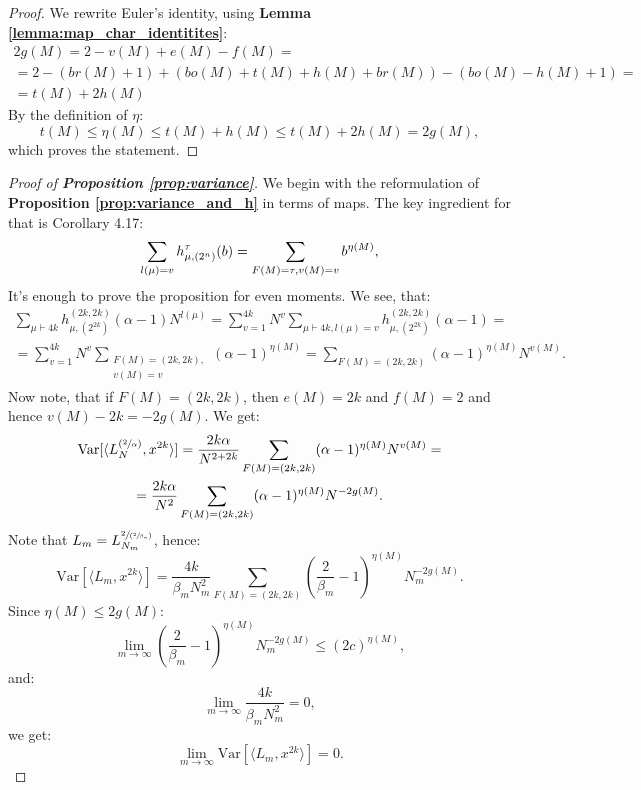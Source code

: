 \documentclass{article}
\newcommand{\Var}{\mathrm{Var}}
\begin{document}
\begin{proof}
    We rewrite Euler's identity, using \textbf{Lemma \ref{lemma:map_char_identitites}}:
    \begin{multline*}
        2g(M) = 2 - v(M) + e(M) - f(M) = \\ = 2 - (br(M) + 1) + (bo(M) + t(M) + h(M) + br(M)) - (bo(M) - h(M) + 1) = \\ = t(M) + 2h(M)
    \end{multline*}
    By the definition of $\eta$:
    $$
        t(M) \leq \eta(M) \leq t(M) + h(M) \leq t(M) + 2h(M) = 2g(M),
    $$
    which proves the statement.
\end{proof}


\begin{proof}[Proof of \textbf{Proposition \ref{prop:variance}}]
    We begin with the reformulation of \textbf{Proposition \ref{prop:variance_and_h}} in terms of maps. The key ingredient for that is 		\cite{lacroix} Corollary 4.17:
	$$
		\sum\limits_{l(\mu) = v}h_{\mu, (2^n)}^{\tau}(b) = \sum\limits_{F(M) = \tau, \\ v(M) = v}b^{\eta(M)},
	$$
    It's enough to prove the proposition for even moments. We see, that:
    \begin{multline}
        \sum\limits_{\mu \vdash 4k}h_{\mu, (2^{2k})}^{(2k, 2k)}(\alpha - 1)N^{l(\mu)} = \sum\limits_{v = 1}^{4k}N^{v}\sum\limits_{\mu \vdash 4k, l(\mu) = v}h_{\mu, (2^{2k})}^{(2k, 2k)}(\alpha - 1) = \\
        = \sum\limits_{v = 1}^{4k}N^v\sum\limits_{\substack{F(M) = (2k, 2k), \\ v(M) = v}}(\alpha - 1)^{\eta(M)} = \sum\limits_{F(M)=(2k,2k)}(\alpha - 1)^{\eta(M)}N^{v(M)}.
    \end{multline}
    Now note, that if $F(M) = (2k, 2k)$, then $e(M) = 2k$ and $f(M) = 2$ and hence $v(M) - 2k = -2g(M)$. We get: 
    \begin{multline}
        \Var[\langle L_{N}^{(\sfrac{2}{\alpha})}, x^{2k} \rangle] = \frac{2k\alpha}{N^{2 + 2k}}\sum\limits_{F(M)=(2k,2k)}(\alpha - 1)^{\eta(M)}N^{v(M)} = \\
        = \frac{2k\alpha}{N^2}\sum\limits_{F(M)=(2k,2k)}(\alpha - 1)^{\eta(M)}N^{-2g(M)}.
    \end{multline}
    Note that $L_m = L_{N_m}^{\sfrac{2}{(\sfrac{2}{\beta_m})}}$, hence:
    $$
        \Var[\langle L_{m}, x^{2k} \rangle] = \frac{4k}{\beta_ mN_m^2}\sum\limits_{F(M)=(2k,2k)}\left(\frac{2}{\beta_m} - 1\right)^{\eta(M)}N_m^{-2g(M)}.
    $$
    Since $\eta(M) \leq 2g(M)$:
    $$
        \lim\limits_{m \to \infty}\left(\frac{2}{\beta_m} - 1\right)^{\eta(M)}N_m^{-2g(M)} \leq (2c)^{\eta(M)},
    $$
    and:
    $$
        \lim\limits_{m \to \infty}\frac{4k}{\beta_ mN_m^2} = 0,
    $$
    we get:
    $$
        \lim\limits_{m \to \infty}\Var[\langle L_{m}, x^{2k} \rangle] = 0.
    $$
    
\end{proof}
\end{document}
